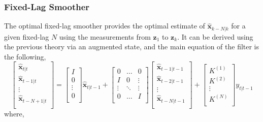 \subsubsection{Fixed-Lag Smoother}
The optimal fixed-lag smoother provides the optimal estimate of $\hat{\textbf{x}}_{k - N | k}$ for a given fixed-lag $N$ using the measurements from $\textbf{z}_{1}$ to $\textbf{z}_{k}$. It can be derived using the previous theory via an augmented state, and the main equation of the filter is the following,
\[
\begin{bmatrix}
\hat{\textbf{x}}_{t|t} \\ \hat{\textbf{x}}_{t-1|t} \\ \vdots \\ \hat{\textbf{x}}_{t-N+1|t} \\ \end{bmatrix} = \begin{bmatrix} I \\ 0 \\ \vdots \\ 0 \\ \end{bmatrix} \hat{\textbf{x}}_{t|t-1} + \begin{bmatrix} 0 & \ldots & 0 \\ I & 0 & \vdots \\ \vdots & \ddots & \vdots \\ 0 & \ldots & I \\ \end{bmatrix} \begin{bmatrix} \hat{\textbf{x}}_{t-1|t-1} \\ \hat{\textbf{x}}_{t-2|t-1} \\ \vdots \\ \hat{\textbf{x}}_{t-N|t-1} \\ \end{bmatrix} + \begin{bmatrix} K^{(1)} \\ K^{(2)} \\ \vdots \\ K^{(N)} \\
\end{bmatrix}
y_{t|t-1}
\]
where,
